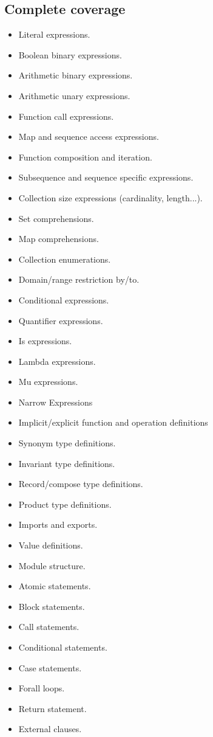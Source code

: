 \documentclass{entcs}
\begin{document}
\subsection{Complete coverage}
\begin{itemize}
    \item Literal expressions.
    \item Boolean binary expressions.
    \item Arithmetic binary expressions.
    \item Arithmetic unary expressions.
    \item Function call expressions.
    \item Map and sequence access expressions.
    \item Function composition and iteration.
    \item Subsequence and sequence specific expressions.
    \item Collection size expressions (cardinality, length...).
    \item Set comprehensions.
    \item Map comprehensions.
    \item Collection enumerations.
    \item Domain/range restriction by/to.
    \item Conditional expressions. 
    \item Quantifier expressions.
    \item Is expressions.
    \item Lambda expressions.
    \item Mu expressions.
    \item Narrow Expressions

    \item Implicit/explicit function and operation definitions 
    \item Synonym type definitions.
    \item Invariant type definitions.
    \item Record/compose type definitions.
    \item Product type definitions.
    \item Imports and exports.
    \item Value definitions. 

    \item Module structure.

    \item Atomic statements.
    \item Block statements.
    \item Call statements.
    \item Conditional statements.
    \item Case statements.
    \item Forall loops.
    \item Return statement.
    \item External clauses.
\end{itemize}
\end{document}
